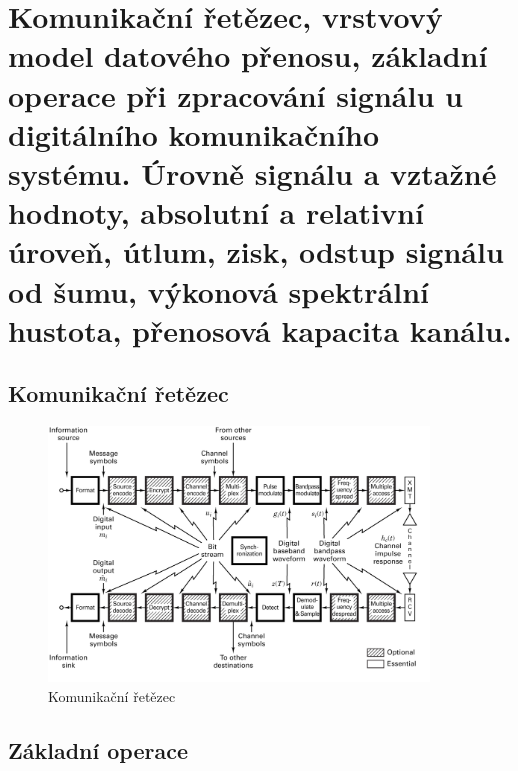 \section{Komunikační řetězec, vrstvový model datového přenosu, základní operace při zpracování signálu u digitálního komunikačního systému. Úrovně signálu a vztažné hodnoty, absolutní a relativní úroveň, útlum, zisk, odstup signálu od šumu, výkonová spektrální hustota, přenosová kapacita kanálu.
}

\subsection{Komunikační řetězec}

\begin{figure}[h]
    \centering
	\includegraphics[width=0.9\textwidth]{images/01-kom-retezec.png}
    \caption{Komunikační řetězec}
    \label{komStr}
\end{figure}

\subsection{Základní operace}


